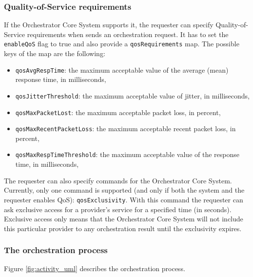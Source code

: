 \documentclass[a4paper]{arrowhead}
\begin{document}
\subsubsection{Quality-of-Service requirements}

If the Orchestrator Core System supports it, the requester can specify Quality-of-Service requirements when sends an orchestration request. It has to set the \texttt{enableQoS} flag to true and also provide a \texttt{qosRequirements} map. The possible keys of the map are the following:

\begin{itemize}
    \item \texttt{qosAvgRespTime}: the maximum acceptable value of the average (mean) response time, in milliseconds,
    \item \texttt{qosJitterThreshold}: the maximum acceptable value of jitter, in milliseconds,
    \item \texttt{qosMaxPacketLost}: the maximum acceptable packet loss, in percent,
    \item \texttt{qosMaxRecentPacketLoss}: the maximum acceptable recent packet loss, in percent,
    \item \texttt{qosMaxRespTimeThreshold}: the maximum acceptable value of the response time, in milliseconds,
\end{itemize}

The requester can also specify commands for the Orchestrator Core System. Currently, only one command is supported (and only if both the system and the requester enables QoS): \texttt{qosExclusivity}. With this command the requester can ask exclusive access for a provider's service for a specified time (in seconds). Exclusive access only means that the Orchestrator Core System will not include this particular provider to any orchestration result until the exclusivity expires.

\clearpage

\subsubsection{The orchestration process}

Figure \ref{fig:activity_uml} describes the orchestration process.
\end{document}
